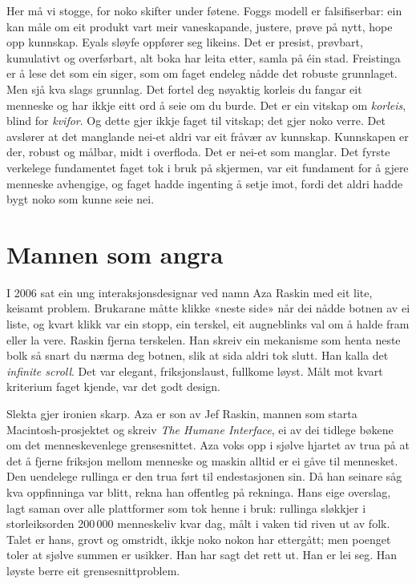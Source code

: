 Her må vi stogge, for noko skifter under føtene. Foggs modell er falsifiserbar: ein kan måle om eit produkt vart meir vaneskapande, justere, prøve på nytt, hope opp kunnskap. Eyals sløyfe oppfører seg likeins. Det er presist, prøvbart, kumulativt og overførbart, alt boka har leita etter, samla på éin stad. Freistinga er å lese det som ein siger, som om faget endeleg nådde det robuste grunnlaget. Men sjå kva slags grunnlag. Det fortel deg nøyaktig korleis du fangar eit menneske og har ikkje eitt ord å seie om du burde. Det er ein vitskap om \emph{korleis}, blind for \emph{kvifor}. Og dette gjer ikkje faget til vitskap; det gjer noko verre. Det avslører at det manglande nei-et aldri var eit fråvær av kunnskap. Kunnskapen er der, robust og målbar, midt i overfloda. Det er nei-et som manglar. Det fyrste verkelege fundamentet faget tok i bruk på skjermen, var eit fundament for å gjere menneske avhengige, og faget hadde ingenting å setje imot, fordi det aldri hadde bygt noko som kunne seie nei.

\section{Mannen som angra}

I 2006 sat ein ung interaksjonsdesignar ved namn Aza Raskin med eit lite, keisamt problem. Brukarane måtte klikke «neste side» når dei nådde botnen av ei liste, og kvart klikk var ein stopp, ein terskel, eit augneblinks val om å halde fram eller la vere. Raskin fjerna terskelen. Han skreiv ein mekanisme som henta neste bolk så snart du nærma deg botnen, slik at sida aldri tok slutt. Han kalla det \emph{infinite scroll}. Det var elegant, friksjonslaust, fullkome løyst. Målt mot kvart kriterium faget kjende, var det godt design.

Slekta gjer ironien skarp. Aza er son av Jef Raskin, mannen som starta Macintosh-prosjektet og skreiv \textit{The Humane Interface}, ei av dei tidlege bøkene om det menneskevenlege grensesnittet. Aza voks opp i sjølve hjartet av trua på at det å fjerne friksjon mellom menneske og maskin alltid er ei gåve til mennesket. Den uendelege rullinga er den trua ført til endestasjonen sin. Då han seinare såg kva oppfinninga var blitt, rekna han offentleg på rekninga. Hans eige overslag, lagt saman over alle plattformer som tok henne i bruk: rullinga sløkkjer i storleiksorden 200\,000 menneskeliv kvar dag, målt i vaken tid riven ut av folk. Talet er hans, grovt og omstridt, ikkje noko nokon har ettergått; men poenget toler at sjølve summen er usikker. Han har sagt det rett ut. Han er lei seg. Han løyste berre eit grensesnittproblem.

